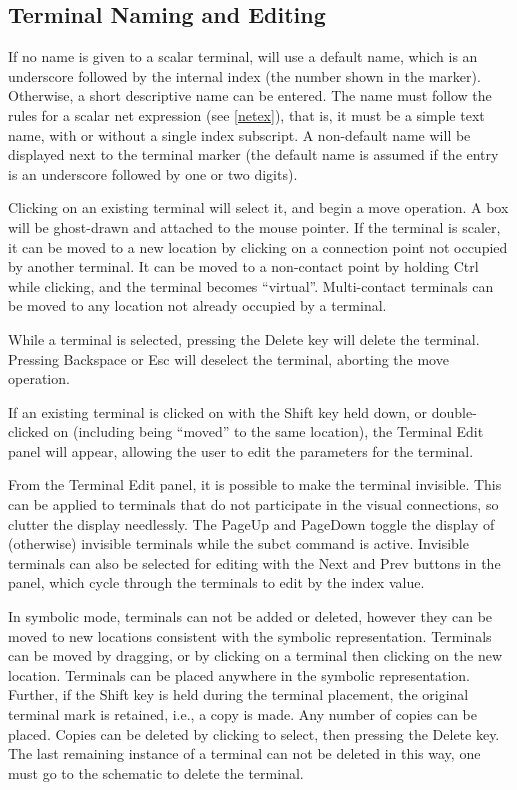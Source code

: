 \subsection{Terminal Naming and Editing}

If no name is given to a scalar terminal, {\Xic} will use a default
name, which is an underscore followed by the internal index (the
number shown in the marker).  Otherwise, a short descriptive name can
be entered.  The name must follow the rules for a scalar net
expression (see \ref{netex}), that is, it must be a simple text name,
with or without a single index subscript.  A non-default name will be
displayed next to the terminal marker (the default name is assumed if
the entry is an underscore followed by one or two digits).

Clicking on an existing terminal will select it, and begin a move
operation.  A box will be ghost-drawn and attached to the mouse
pointer.  If the terminal is scaler, it can be moved to a new location
by clicking on a connection point not occupied by another terminal. 
It can be moved to a non-contact point by holding {\kb Ctrl} while
clicking, and the terminal becomes ``virtual''.  Multi-contact
terminals can be moved to any location not already occupied by a
terminal.

While a terminal is selected, pressing the {\kb Delete} key will
delete the terminal.  Pressing {\kb Backspace} or {\kb Esc} will
deselect the terminal, aborting the move operation.

If an existing terminal is clicked on with the {\kb Shift} key held
down, or double-clicked on (including being ``moved'' to the same
location), the {\cb Terminal Edit} panel will appear, allowing the
user to edit the parameters for the terminal.

From the {\cb Terminal Edit} panel, it is possible to make the
terminal invisible.  This can be applied to terminals that do not
participate in the visual connections, so clutter the display
needlessly.  The {\kb PageUp} and {\kb PageDown} toggle the display of
(otherwise) invisible terminals while the {\cb subct} command is
active.  Invisible terminals can also be selected for editing with the
{\cb Next} and {\cb Prev} buttons in the panel, which cycle through
the terminals to edit by the index value.

In symbolic mode, terminals can not be added or deleted, however they
can be moved to new locations consistent with the symbolic
representation.  Terminals can be moved by dragging, or by clicking on
a terminal then clicking on the new location.  Terminals can be placed
anywhere in the symbolic representation.  Further, if the {\kb Shift}
key is held during the terminal placement, the original terminal mark
is retained, i.e., a copy is made.  Any number of copies can be
placed.  Copies can be deleted by clicking to select, then pressing
the {\kb Delete} key.  The last remaining instance of a terminal can
not be deleted in this way, one must go to the schematic to delete the
terminal.


